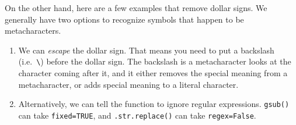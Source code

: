 \documentclass[12pt,krantz2]{krantz}
\makeatletter
\newenvironment{Shaded}{\begin{snugshade}}{\end{snugshade}}
\newcommand{\BuiltInTok}[1]{#1}
\newcommand{\CharTok}[1]{\textcolor[rgb]{0.5,0.5,0.5}{#1}}
\newcommand{\CommentTok}[1]{\textcolor[rgb]{0.37,0.37,0.37}{\textit{#1}}}
\newcommand{\DataTypeTok}[1]{\textcolor[rgb]{0.27,0.27,0.27}{#1}}
\newcommand{\KeywordTok}[1]{\textcolor[rgb]{0.27,0.27,0.27}{\textbf{#1}}}
\newcommand{\NormalTok}[1]{#1}
\newcommand{\OperatorTok}[1]{\textcolor[rgb]{0.43,0.43,0.43}{\textbf{#1}}}
\newcommand{\OtherTok}[1]{\textcolor[rgb]{0.37,0.37,0.37}{#1}}
\newcommand{\StringTok}[1]{\textcolor[rgb]{0.5,0.5,0.5}{#1}}
\newcommand{\VariableTok}[1]{\textcolor[rgb]{0,0,0}{#1}}
\providecommand{\tightlist}{%
  \setlength{\itemsep}{0pt}\setlength{\parskip}{0pt}}
\newenvironment{kframe}{%
\medskip{}
\setlength{\fboxsep}{.8em}
 \def\at@end@of@kframe{}%
 \ifinner\ifhmode%
  \def\at@end@of@kframe{\end{minipage}}%
  \begin{minipage}{\columnwidth}%
 \fi\fi%
 \def\FrameCommand##1{\hskip\@totalleftmargin \hskip-\fboxsep
 \colorbox{shadecolor}{##1}\hskip-\fboxsep
     \hskip-\linewidth \hskip-\@totalleftmargin \hskip\columnwidth}%
 \MakeFramed {\advance\hsize-\width
   \@totalleftmargin\z@ \linewidth\hsize
   \@setminipage}}%
 {\par\unskip\endMakeFramed%
 \at@end@of@kframe}
\renewenvironment{Shaded}{\begin{kframe}}{\end{kframe}}
\makeatother
\begin{document}
On the other hand, here are a few examples that remove dollar signs. We generally have two options to recognize symbols that happen to be metacharacters.

\begin{enumerate}
\def\labelenumi{\arabic{enumi}.}
\tightlist
\item
  We can \emph{escape} the dollar sign. That means you need to put a backslash (i.e.~\texttt{\textbackslash{}}) before the dollar sign. The backslash is a metacharacter looks at the character coming after it, and it either removes the special meaning from a metacharacter, or adds special meaning to a literal character.
\item
  Alternatively, we can tell the function to ignore regular expressions. \texttt{gsub()} can take \texttt{fixed=TRUE}, and \texttt{.str.replace()} can take \texttt{regex=False}.
\end{enumerate}

\begin{Shaded}
\end{Shaded}

\begin{Shaded}
\end{Shaded}
\end{document}
